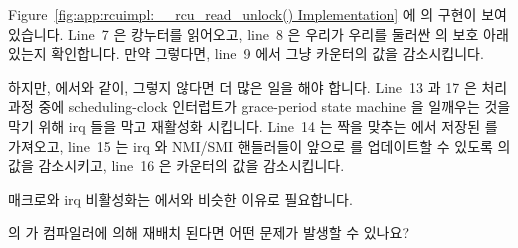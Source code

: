 Figure~\ref{fig:app:rcuimpl:__rcu_read_unlock() Implementation}
에  의 구현이 보여 있습니다.
Line~7 은  캉누터를 읽어오고,
line~8 은 우리가 우리를 둘러싼  의 보호 아래 있는지
확인합니다.
만약 그렇다면, line~9 에서 그냥 카운터의 값을 감소시킵니다.

하지만,  에서와 같이, 그렇지 않다면 더 많은 일을 해야
합니다.
Line~13 과 17 은  처리 과정 중에 scheduling-clock
인터럽트가 grace-period state machine 을 일깨우는 것을 막기 위해 irq 들을 막고
재활성화 시킵니다.
Line~14 는 짝을 맞추는  에서 저장된  를
가져오고, line~15 는 irq 와 NMI/SMI 핸들러들이 앞으로  를
업데이트할 수 있도록  의 값을 감소시키고, line~16 은
카운터의 값을 감소시킵니다.

 매크로와 irq 비활성화는  에서와 비슷한
이유로 필요합니다.

\QuickQuiz{}
	 의  가 컴파일러에 의해 재배치
	된다면 어떤 문제가 발생할 수 있나요?
	\iffalse

